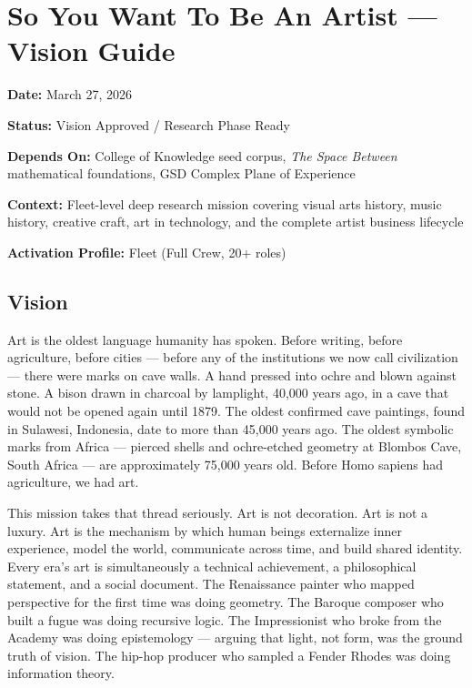 \documentclass[11pt,letterpaper]{article}
\newcommand{\stageheader}[2]{%
  \noindent\colorbox{#2}{\makebox[\textwidth][l]{%
    \textcolor{white}{\bfseries\sffamily\hspace{6pt}#1\hspace{6pt}}}}%
  \vspace{0.5em}\par%
}
\newcommand{\metafield}[2]{\textbf{\sffamily #1} #2\par}
\begin{document}
\tableofcontents
\newpage

\stageheader{STAGE 1 --- VISION DOCUMENT}{primary}

\section{So You Want To Be An Artist --- Vision Guide}

\metafield{Date:}{March 27, 2026}
\metafield{Status:}{Vision Approved / Research Phase Ready}
\metafield{Depends On:}{College of Knowledge seed corpus, \emph{The Space Between} mathematical foundations, GSD Complex Plane of Experience}
\metafield{Context:}{Fleet-level deep research mission covering visual arts history, music history, creative craft, art in technology, and the complete artist business lifecycle}
\metafield{Activation Profile:}{Fleet (Full Crew, 20+ roles)}

\subsection{Vision}

Art is the oldest language humanity has spoken. Before writing, before agriculture, before cities --- before any of the institutions we now call civilization --- there were marks on cave walls. A hand pressed into ochre and blown against stone. A bison drawn in charcoal by lamplight, 40,000 years ago, in a cave that would not be opened again until 1879. The oldest confirmed cave paintings, found in Sulawesi, Indonesia, date to more than 45,000 years ago. The oldest symbolic marks from Africa --- pierced shells and ochre-etched geometry at Blombos Cave, South Africa --- are approximately 75,000 years old. Before Homo sapiens had agriculture, we had art.

This mission takes that thread seriously. Art is not decoration. Art is not a luxury. Art is the mechanism by which human beings externalize inner experience, model the world, communicate across time, and build shared identity. Every era's art is simultaneously a technical achievement, a philosophical statement, and a social document. The Renaissance painter who mapped perspective for the first time was doing geometry. The Baroque composer who built a fugue was doing recursive logic. The Impressionist who broke from the Academy was doing epistemology --- arguing that light, not form, was the ground truth of vision. The hip-hop producer who sampled a Fender Rhodes was doing information theory.
\end{document}
